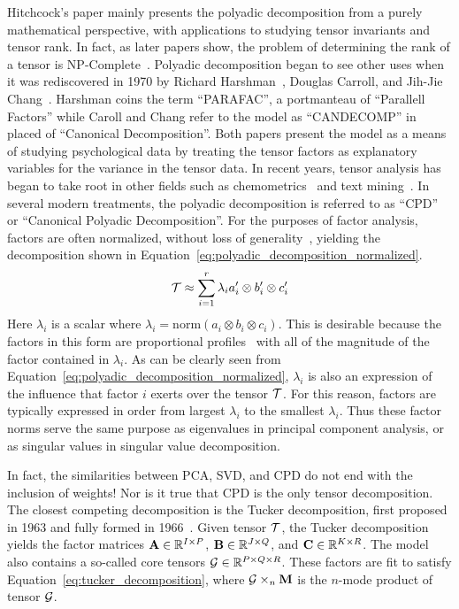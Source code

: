 \documentclass[../dissertation.tex]{subfiles}
\begin{document}
Hitchcock's paper mainly presents the polyadic decomposition from a
purely mathematical perspective, with applications to studying tensor
invariants and tensor rank.  In fact, as later papers show, the
problem of determining the rank of a tensor is
NP-Complete~\cite{haastad1990}.  Polyadic decomposition began to see
other uses when it was rediscovered in 1970 by Richard
Harshman~\cite{harshman1970}, Douglas Carroll, and Jih-Jie
Chang~\cite{carroll1970}.  Harshman coins the term ``PARAFAC'', a
portmanteau of ``Parallell Factors'' while Caroll and Chang refer to
the model as ``CANDECOMP'' in placed of ``Canonical Decomposition''.
Both papers present the model as a means of studying psychological
data by treating the tensor factors as explanatory variables for the
variance in the tensor data.  In recent years, tensor analysis has
began to take root in other fields such as chemometrics~\cite{bro1997}
and text mining~\cite{bader2007}.  In several modern treatments, the
polyadic decomposition is referred to as ``CPD'' or ``Canonical
Polyadic Decomposition''.  For the purposes of factor analysis,
factors are often normalized, without loss of
generality~\cite{bro1997, bader2007}, yielding the decomposition shown
in Equation~\ref{eq:polyadic_decomposition_normalized}.
\begin{equation} \label{eq:polyadic_decomposition_normalized}
  \mathcal{T} \approx \displaystyle\sum_{i=1}^{r} \lambda_i a'_i
  \otimes b'_i \otimes c'_i
\end{equation}
Here $\lambda_i$ is a scalar where $\lambda_i = \mathrm{norm}(a_i
\otimes b_i \otimes c_i)$.  This is desirable because the factors in
this form are proportional profiles~\cite{harshman1970} with all of
the magnitude of the factor contained in $\lambda_i$.  As can be
clearly seen from Equation~\ref{eq:polyadic_decomposition_normalized},
$\lambda_i$ is also an expression of the influence that factor $i$
exerts over the tensor $\mathcal{T}$.  For this reason, factors are
typically expressed in order from largest $\lambda_i$ to the smallest
$\lambda_i$.  Thus these factor norms serve the same purpose as
eigenvalues in principal component analysis, or as singular values in
singular value decomposition.

In fact, the similarities between PCA, SVD, and CPD do not end with
the inclusion of weights!  Nor is it true that CPD is the only tensor
decomposition.  The closest competing decomposition is the Tucker
decomposition, first proposed in 1963 and fully formed in
1966~\cite{kolda2009}.  Given tensor $\mathcal{T}$, the Tucker
decomposition yields the factor matrices $\mathrm{\bf 
  A}\in\mathbb{R}^{I\times P}$, $\mathrm{\bf  B} \in
\mathbb{R}^{J\times Q}$, and $\mathrm{\bf  C}\in
\mathbb{R}^{K\times R}$.  The model also contains a so-called core
tensors $\mathcal{G} \in \mathbb{R}^{P\times Q \times R}$.  These
factors are fit to satisfy Equation~\ref{eq:tucker_decomposition},
where $\mathcal{G} \times_n \mathrm{\bf  M}$ is the $n$-mode product of
tensor $\mathcal{G}$.
\end{document}
